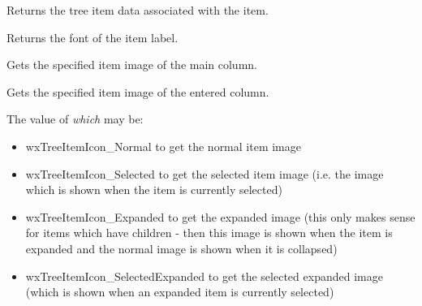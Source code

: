 
Returns the tree item data associated with the item.





\label{wxtreelistctrlgetitemfont}


Returns the font of the item label.

\label{wxtreelistctrlgetitemimage}


Gets the specified item image of the main column.


Gets the specified item image of the entered column.

The value of {\it which} may be:

\begin{itemize}\itemsep=0pt
\item{wxTreeItemIcon\_Normal} to get the normal item image
\item{wxTreeItemIcon\_Selected} to get the selected item image (i.e. the image
which is shown when the item is currently selected)
\item{wxTreeItemIcon\_Expanded} to get the expanded image (this only
makes sense for items which have children - then this image is shown when the
item is expanded and the normal image is shown when it is collapsed)
\item{wxTreeItemIcon\_SelectedExpanded} to get the selected expanded image
(which is shown when an expanded item is currently selected)
\end{itemize}

